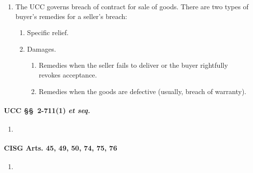 \begin{enumerate}
    \item The UCC governs breach of contract for sale of goods. There are two 
    types of buyer's remedies for a seller's breach:
    \begin{enumerate}
        \item Specific relief.
        \item Damages.
        \begin{enumerate}
            \item Remedies when the seller fails to deliver or the buyer 
            rightfully revokes acceptance.
            \item Remedies when the goods are defective (usually, breach of 
            warranty).
        \end{enumerate}
    \end{enumerate}
\end{enumerate}

\paragraph{UCC \S\S\ 2-711(1) \emph{et seq.}}

\begin{enumerate}
    \item %
\end{enumerate}

\paragraph{CISG Arts. 45, 49, 50, 74, 75, 76}

\begin{enumerate}
    \item %
\end{enumerate}


